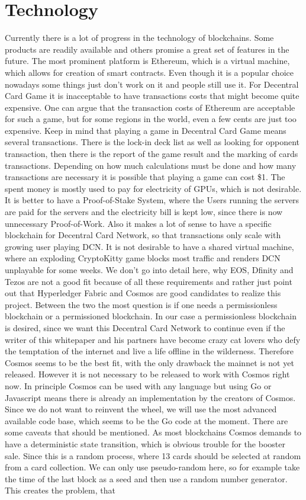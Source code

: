 \documentclass{article}
\begin{document}
\section{Technology}
%
Currently there is a lot of progress in the technology of blockchains. Some products are readily available and others promise a great set of features in the future. The most prominent platform is Ethereum, which is a virtual machine, which allows for creation of smart contracts. Even though it is a popular choice nowadays some things just don't work on it and people still use it. For Decentral Card Game it is inacceptable to have transactions costs that might become quite expensive. One can argue that the transaction costs of Ethereum are acceptable for such a game, but for some regions in the world, even a few cents are just too expensive. Keep in mind that playing a game in Decentral Card Game means several transactions. There is the lock-in deck list as well as looking for opponent transaction, then there is the report of the game result and the marking of cards transactions. Depending on how much calculations must be done and how many transactions are necessary it is possible that playing a game can cost \$1. The spent money is mostly used to pay for electricity of GPUs, which is not desirable. It is better to have a Proof-of-Stake System, where the Users running the servers are paid for the servers and the electricity bill is kept low, since there is now unnecessary Proof-of-Work. Also it makes a lot of sense to have a specific blockchain for Decentral Card Network, so that transactions only scale with growing user playing DCN. It is not desirable to have a shared virtual machine, where an exploding CryptoKitty game blocks most traffic and renders DCN unplayable for some weeks. We don't go into detail here, why EOS, Dfinity and Tezos are not a good fit because of all these requirements and rather just point out that Hyperledger Fabric and Cosmos are good candidates to realize this project. Between the two the most question is if one needs a permissionless blockchain or a permissioned blockchain. In our case a permissionless blockchain is desired, since we want this Decentral Card Network to continue even if the writer of this whitepaper and his partners have become crazy cat lovers who defy the temptation of the internet and live a life offline in the wilderness. Therefore Cosmos seems to be the best fit, with the only drawback the mainnet is not yet released. However it is not necessary to be released to work with Cosmos right now. In principle Cosmos can be used with any language but using Go or Javascript means there is already an implementation by the creators of Cosmos. Since we do not want to reinvent the wheel, we will use the most advanced available code base, which seems to be the Go code at the moment. There are some caveats that should be mentioned. As most blockchains Cosmos demands to have a deterministic state transition, which is obvious trouble for the booster sale. Since this is a random process, where 13 cards should be selected at random from a card collection. We can only use pseudo-random here, so for example take the time of the last block as a seed and then use a random number generator. This creates the problem, that 
\end{document}
